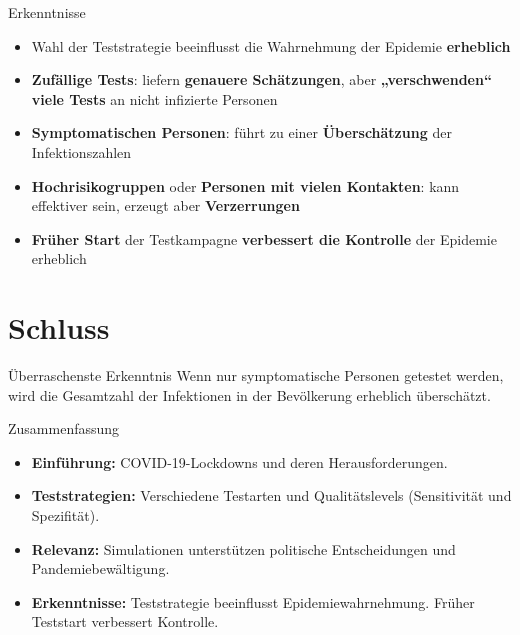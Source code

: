 \documentclass[ngerman,14pt,aspectratio=1610]{beamer}
\def\secname{Gliederung} %
\let\oldsection\section
\renewcommand{\section}[1]{
	\oldsection{#1}
	\newtotcounter{#1}
	\def\secname{#1}
}
\newcommand{\source}{}
\begin{document}
	\begin{frame}[t]{Erkenntnisse}
		\begin{itemize}
			\item Wahl der Teststrategie beeinflusst die Wahrnehmung der Epidemie \textbf{erheblich}
			\item \textbf{\alert{Zufällige Tests}}: liefern \textbf{genauere Schätzungen}, aber \textbf{„verschwenden“ viele Tests} an nicht infizierte Personen
			\item \textbf{\alert{Symptomatischen Personen}}: führt zu einer \textbf{Überschätzung} der Infektionszahlen
			\item \textbf{\alert{Hochrisikogruppen}} oder \textbf{\alert{Personen mit vielen Kontakten}}: kann effektiver sein, erzeugt aber \textbf{Verzerrungen}
			\item \textbf{Früher Start} der Testkampagne \textbf{verbessert die Kontrolle} der Epidemie erheblich
		\end{itemize}
	\end{frame}
	
	\section{Schluss}
		\renewcommand{\source}{ }
	
		\begin{frame}[t]{Überraschenste Erkenntnis} \vspace{80pt}
			 Wenn nur symptomatische Personen getestet werden, wird die Gesamtzahl der Infektionen in der Bevölkerung erheblich überschätzt.
		\end{frame}
		
		\begin{frame}[t]{Zusammenfassung} \vspace{15pt}
			\begin{itemize}
				\item \textbf{Einführung:} COVID-19-Lockdowns und deren Herausforderungen. 
				\item \textbf{Teststrategien:} Verschiedene Testarten und Qualitätslevels (Sensitivität und Spezifität).
				\item \textbf{Relevanz:} Simulationen unterstützen politische Entscheidungen und Pandemiebewältigung.
				\item \textbf{Erkenntnisse:} Teststrategie beeinflusst Epidemiewahrnehmung. Früher Teststart verbessert Kontrolle.
			\end{itemize}
		\end{frame}
	
\end{document}
